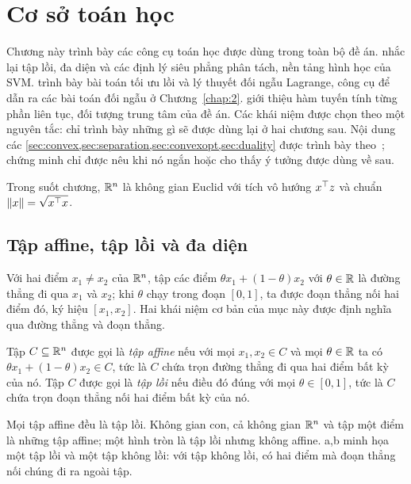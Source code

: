 \chapter{Cơ sở toán học}\label{chap:1}

Chương này trình bày các công cụ toán học được dùng trong toàn bộ đề án.  nhắc lại tập lồi, đa diện và các định lý siêu phẳng phân tách, nền tảng hình học của SVM.  trình bày bài toán tối ưu lồi và lý thuyết đối ngẫu Lagrange, công cụ để dẫn ra các bài toán đối ngẫu ở Chương~\ref{chap:2}.  giới thiệu hàm tuyến tính từng phần liên tục, đối tượng trung tâm của đề án. Các khái niệm được chọn theo một nguyên tắc: chỉ trình bày những gì sẽ được dùng lại ở hai chương sau. Nội dung các \cref{sec:convex,sec:separation,sec:convexopt,sec:duality} được trình bày theo~\cite{boyd2004,dovanluu2000}; chứng minh chỉ được nêu khi nó ngắn hoặc cho thấy ý tưởng được dùng về sau.

Trong suốt chương, $\mathbb{R}^n$ là không gian Euclid với tích vô hướng $x^\top z$ và chuẩn $\|x\|=\sqrt{x^\top x}$.

\section{Tập affine, tập lồi và đa diện}\label{sec:convex}

Với hai điểm $x_1\neq x_2$ của $\mathbb{R}^n$, tập các điểm $\theta x_1+(1-\theta)x_2$ với $\theta\in\mathbb{R}$ là đường thẳng đi qua $x_1$ và $x_2$; khi $\theta$ chạy trong đoạn $[0,1]$, ta được đoạn thẳng nối hai điểm đó, ký hiệu $[x_1,x_2]$. Hai khái niệm cơ bản của mục này được định nghĩa qua đường thẳng và đoạn thẳng.

\begin{definition}\label{def:affine-convex}
Tập $C\subseteq\mathbb{R}^n$ được gọi là \emph{tập affine} nếu với mọi $x_1,x_2\in C$ và mọi $\theta\in\mathbb{R}$ ta có $\theta x_1+(1-\theta)x_2\in C$, tức là $C$ chứa trọn đường thẳng đi qua hai điểm bất kỳ của nó. Tập $C$ được gọi là \emph{tập lồi} nếu điều đó đúng với mọi $\theta\in[0,1]$, tức là $C$ chứa trọn đoạn thẳng nối hai điểm bất kỳ của nó.
\end{definition}

Mọi tập affine đều là tập lồi. Không gian con, cả không gian $\mathbb{R}^n$ và tập một điểm là những tập affine; một hình tròn là tập lồi nhưng không affine. a,b minh họa một tập lồi và một tập không lồi: với tập không lồi, có hai điểm mà đoạn thẳng nối chúng đi ra ngoài tập.

